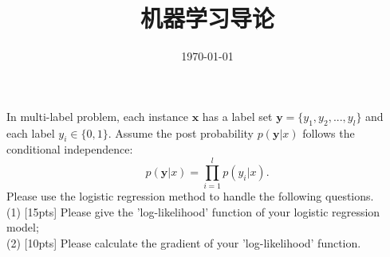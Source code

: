 \documentclass[11pt, a4paper, UTF8]{ctexart}
\title{机器学习导论}
\date{\today}
\begin{document}
\maketitle
\noplagiarism

\beginthishw
\begin{problem}[ML problem 1]
In multi-label problem, each instance $\bm{x}$ has a label set $\bm{y}=\{y_1,y_2,...,y_l\}$ and each label $y_i\in\{0,1\}$. Assume the post probability $p(\bm{y}|x)$ follows the conditional independence:\\
\begin{equation}
p(\bm{y}|x)=\prod\limits_{i=1}^l p(y_i|x).
\end{equation}
Please use the logistic regression method to handle the following questions.\\
(1) [15pts] Please give the 'log-likelihood' function of your logistic regression model;\\
(2) [10pts] Please calculate the gradient of your 'log-likelihood' function.\\     


\end{problem}
\end{document}
